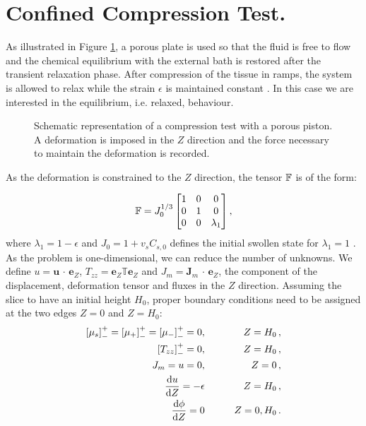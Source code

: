 \section{Confined Compression Test.}
\label{excomp}
As illustrated in Figure \ref{confcomp}, a porous plate is used so that the fluid is free to flow and the chemical equilibrium with the external bath is restored after the transient relaxation phase. After compression of the tissue in ramps, the system is allowed to relax while the strain $\epsilon$ is maintained constant \cite{Netti}. In this case we are interested in the equilibrium, i.e. relaxed, behaviour. 

\begin{figure}[h]
	\centering
	\def\svgwidth{0.89\linewidth}
	
	\vspace{2mm}
	\caption{Schematic representation of a compression test with a porous piston. A deformation is imposed in the $Z$ direction and the force necessary to maintain the deformation is recorded. }
	\label{confcomp}
\end{figure}

As the deformation is constrained to the $Z$ direction, the tensor $\mathbb{F}$ is of the form:

\begin{equation}
\mathbb{F}=J_0^{1/3}\begin{bmatrix}
1 &0&0\\
0&1&0\\
0&0& \lambda_1
\end{bmatrix},
\label{F} 
\end{equation}
where $\lambda_1 = 1 - \epsilon$ and $J_0=1+v_sC_{s,0}$ defines the initial swollen state for $\lambda_1=1$ . As the problem is one-dimensional, we can reduce the number of unknowns. We define $u=\mathbf{u}\,\cdot\,\mathbf{e}_Z$, $T_{zz}= \mathbf{e}_Z \mathbb{T}\mathbf{e}_Z$ and $J_m=\mathbf{J}_m\,\cdot \,\mathbf{e}_Z$, the component of the displacement, deformation tensor and fluxes in the $Z$ direction. Assuming the slice to have an initial height $H_0$, proper boundary conditions need to be assigned at the two edges $Z=0$ and $Z=H_0$:
\begin{eqnarray}
\left[\mu_s\right]^+_-=\left[\mu_+\right]^+_-=\left[\mu_-\right]^+_-=0, &\qquad& Z=H_0\,,\\
\quad \left[T_{zz}\right]^+_-=0, &\qquad& Z=H_0\,,\\
J_m = u= 0, &\qquad& Z=0\, ,\\
\frac{\text{d} u}{\text{d} Z}=-\epsilon &\qquad& Z=H_0\,,\\
\frac{\text{d} \phi}{\text{d} Z}=0 &\qquad& Z=0,H_0\,.
\end{eqnarray}

